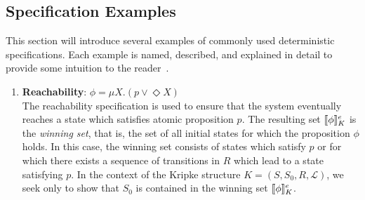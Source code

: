 
\subsection{Specification Examples}

This section will introduce several examples of commonly used deterministic \mucalc{} specifications. Each example is named, described, and explained in detail to provide some intuition to the reader~\cite{Karaman2009}.

\begin{enumerate}[label = (\roman*)]
    \item \textbf{Reachability}: $\phi = \mu X.(p \lor \Diamond X)$\label{reachability_example} \\
        The reachability specification is used to ensure that the system eventually reaches a state which satisfies atomic proposition $p$. The resulting set ${\llbracket}{} \phi {\rrbracket}{}_K^e$ is the {\em winning set}, that is, the set of all initial states for which the proposition $\phi$ holds. In this case, the winning set consists of states which satisfy $p$ or for which there exists a sequence of transitions in $R$ which lead to a state satisfying $p$. In the context of the Kripke structure $K = (S,S_0,R,\mathcal{L})$, we seek only to show that $S_0$ is contained in the winning set ${\llbracket}{} \phi {\rrbracket}{}_K^e$.


\end{enumerate}
